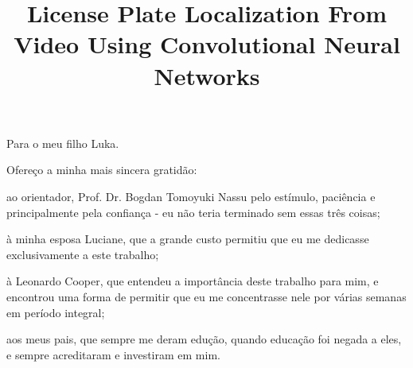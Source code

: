 \documentclass[oneside,a4paper,12pt]{normas-utf-tex}
\title{License Plate Localization From Video Using Convolutional Neural Networks}
\begin{document}
\setcounter{figure}{200}

\capa

\folhaderosto


\begin{dedicatoria}
	Para o meu filho Luka.
\end{dedicatoria}

\begin{agradecimentos}
	Ofereço a minha mais sincera gratidão:

	ao orientador, Prof. Dr. Bogdan Tomoyuki Nassu pelo estímulo,
	paciência e principalmente pela confiança - eu não teria terminado
	sem essas três coisas;

	à minha esposa Luciane, que a grande custo permitiu que eu me
	dedicasse exclusivamente a este trabalho;

	à Leonardo Cooper, que entendeu a importância deste trabalho
	para mim, e encontrou uma forma de permitir que eu me concentrasse
	nele por várias semanas em período integral;

	aos meus pais, que sempre me deram edução, quando educação foi negada
	a eles, e sempre acreditaram e investiram em mim.

\end{agradecimentos}

\begin{resumo}
	
\end{resumo}

\begin{abstract}
	
\end{abstract}


\listadefiguras
\listadetabelas
\listadesiglas

\sumario






%
%

%
%
\end{document}

